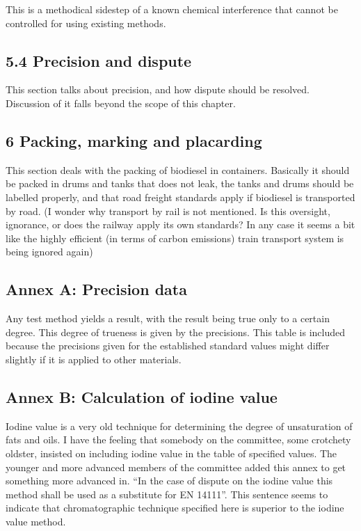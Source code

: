 This is a methodical sidestep of a known chemical interference that cannot be controlled for using existing methods.

\subsection{5.4 Precision and dispute}

This section talks about precision, and how dispute should be resolved. Discussion of it falls beyond the scope of this chapter.

\subsection{6 Packing, marking and placarding}

This section deals with the packing of biodiesel in containers. Basically it should be packed in drums and tanks that does not leak, the tanks and drums should be labelled properly, and that road freight standards apply if biodiesel is transported by road. (I wonder why transport by rail is not mentioned. Is this oversight, ignorance, or does the railway apply its own standards? In any case it seems a bit like the highly efficient (in terms of carbon emissions) train transport system is being ignored again)

\subsection{Annex A: Precision data}

Any test method yields a result, with the result being true only to a certain degree. This degree of trueness is given by the precisions. This table is included because the precisions given for the established standard values might differ slightly if it is applied to other materials.

\subsection{Annex B: Calculation of iodine value}

Iodine value is a very old technique for determining the degree of unsaturation of fats and oils. I have the feeling that somebody on the committee, some crotchety oldster, insisted on including iodine value in the table of specified values. The younger and more advanced members of the committee added this annex to get something more advanced in. ``In the case of dispute on the iodine value this method shall be used as a substitute for EN 14111''. This sentence seems to indicate that chromatographic technique specified here is superior to the iodine value method. 

